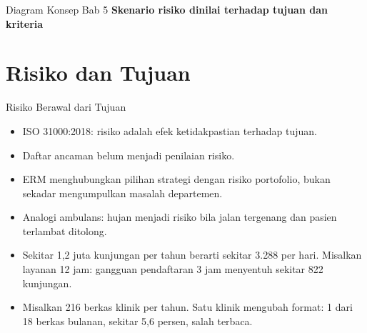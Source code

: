 \documentclass[aspectratio=169, table, 12pt]{beamer}
\begin{document}
\begin{frame}{{\Large Diagram Konsep Bab 5}}
  \centering
  {\small\bfseries Skenario risiko dinilai terhadap tujuan dan kriteria}\par\medskip
  \label{fig:session05-ilustrasi-bab}
\end{frame}

\section{Risiko dan Tujuan}

\begin{frame}{{\Large Risiko Berawal dari Tujuan}}
  \vspace{6pt}
  \small
  \begin{itemize}
    \item ISO 31000:2018: risiko adalah efek ketidakpastian terhadap tujuan.
    \item Daftar ancaman belum menjadi penilaian risiko.
    \item ERM menghubungkan pilihan strategi dengan risiko portofolio, bukan sekadar mengumpulkan
          masalah departemen.
    \item Analogi ambulans: hujan menjadi risiko bila jalan tergenang dan pasien terlambat ditolong.
    \item Sekitar 1,2 juta kunjungan per tahun berarti sekitar 3.288 per hari. Misalkan layanan 12 jam:
          gangguan pendaftaran 3 jam menyentuh sekitar 822 kunjungan.
    \item Misalkan 216 berkas klinik per tahun. Satu klinik mengubah format: 1 dari 18 berkas bulanan,
          sekitar 5,6 persen, salah terbaca.
  \end{itemize}
\end{frame}
\end{document}
